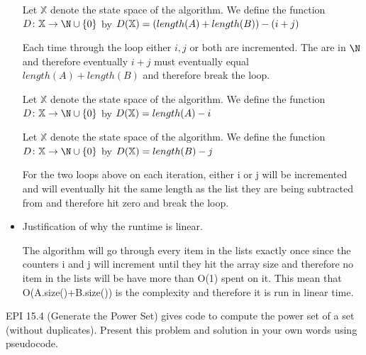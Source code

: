 \documentclass{article}
\begin{document}
\begin{itemize}
 Let $\mathbb{X}$ denote the state space of the algorithm. We define the function $D \colon \mathbb{X} \to \N \cup \{0\}$ by $D( \mathbb{X}) = ( length(A) + length(B) )-(i + j)\newline$
    
    Each time through the loop either $i,j$ or both are incremented. The are in $\N$ and therefore eventually $i + j$ must eventually equal $ length(A) + length(B) $ and therefore break the loop.

    Let $\mathbb{X}$ denote the state space of the algorithm. We define the function $D \colon \mathbb{X} \to \N \cup \{0\}$ by $D( \mathbb{X}) =  length(A) - i\newline $

    Let $\mathbb{X}$ denote the state space of the algorithm. We define the function $D \colon \mathbb{X} \to \N \cup \{0\}$ by $D( \mathbb{X}) =  length(B) - j\newline$
    
    For the two loops above on each iteration, either i or j will be incremented and will eventually hit the same length as the list they are being subtracted from and therefore hit zero and break the loop.
    
   

    
    \item Justification of why the runtime is linear.
    
        The algorithm will go through every item in the lists exactly once since the counters i and j will increment until they hit the array size and therefore no item in the lists will be have more than O(1) spent on it. This mean that O(A.size()+B.size()) is the complexity and therefore it is run in linear time.
    
\end{itemize}

\nextprob
EPI 15.4 (Generate the Power Set) gives code to compute the power set of a set
(without duplicates).  Present this problem and solution in your own words using
pseudocode.
\end{document}
